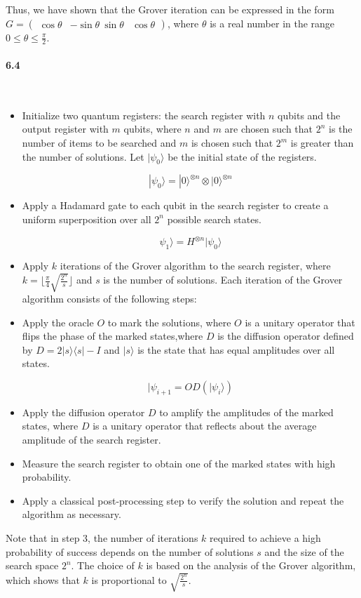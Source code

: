 Thus, we have shown that the Grover iteration can be expressed in the form $G = \begin{pmatrix} \cos\theta & -\sin\theta \ \sin\theta & \cos\theta \end{pmatrix}$, where $\theta$ is a real number in the range $0\leq\theta\leq\frac{\pi}{2}$.

\paragraph{6.4} \textbf{}
\\


\begin{itemize}
    \item Initialize two quantum registers: the search register with $n$ qubits and the output register with $m$ qubits, where $n$ and $m$ are chosen such that $2^n$ is the number of items to be searched and $m$ is chosen such that $2^m$ is greater than the number of solutions. Let $|\psi_0\rangle$ be the initial state of the registers.

    $$ |\psi_0\rangle = |0\rangle^{\otimes n} \otimes |0\rangle^{\otimes n}$$

    \item Apply a Hadamard gate to each qubit in the search register to create a uniform superposition over all $2^n$ possible search states.

    $$\psi_1\rangle = H^{\otimes n} |\psi_0\rangle$$

    \item Apply $k$ iterations of the Grover algorithm to the search register, where $k = \lfloor \frac{\pi}{4} \sqrt{\frac{2^n}{s}} \rfloor$ and $s$ is the number of solutions. Each iteration of the Grover algorithm consists of the following steps:

        \item Apply the oracle $O$ to mark the solutions, where $O$ is a unitary operator that flips the phase of the marked states,where $D$ is the diffusion operator defined by $D=2|s\rangle \langle s| - I$ and $|s\rangle$ is the state that has equal amplitudes over all states.

        $$ |\psi_{i+1} = OD(|\psi_i\rangle)$$

        \item Apply the diffusion operator $D$ to amplify the amplitudes of the marked states, where $D$ is a unitary operator that reflects about the average amplitude of the search register.

    \item Measure the search register to obtain one of the marked states with high probability.

    \item Apply a classical post-processing step to verify the solution and repeat the algorithm as necessary.
\end{itemize}

Note that in step 3, the number of iterations $k$ required to achieve a high probability of success depends on the number of solutions $s$ and the size of the search space $2^n$. The choice of $k$ is based on the analysis of the Grover algorithm, which shows that $k$ is proportional to $\sqrt{\frac{2^n}{s}}$.